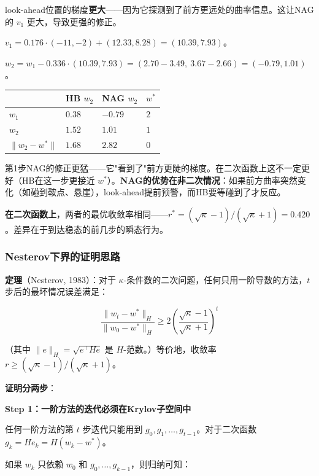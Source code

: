 \documentclass[12pt,a4paper]{article}
\begin{document}
look-ahead位置的梯度\textbf{更大}——因为它探测到了前方更远处的曲率信息。这让NAG的 $v_1$ 更大，导致更强的修正。

$v_1 = 0.176 \cdot (-11,-2) + (12.33, 8.28) = (10.39, 7.93)$。

$w_2 = w_1 - 0.336 \cdot (10.39, 7.93) = (2.70 - 3.49,\ 3.67 - 2.66) = (-0.79, 1.01)$。






\begin{center}\small
\begin{longtable}{|l|l|l|l|}
\hline
 & HB $w_2$ & NAG $w_2$ & $w^*$ \\
\hline
$w_1$ & $0.38$ & $-0.79$ & $2$ \\
$w_2$ & $1.52$ & $1.01$ & $1$ \\
$\|w_2 - w^*\|$ & $1.68$ & $2.82$ & $0$ \\
\hline
\end{longtable}
\end{center}


第1步NAG的修正更猛——它"看到了"前方更陡的梯度。在二次函数上这不一定更好（HB在这一步更接近 $w^*$）。\textbf{NAG的优势在非二次情况}：如果前方曲率突然变化（如碰到鞍点、悬崖），look-ahead提前预警，而HB要等碰到了才反应。

\textbf{在二次函数上}，两者的最优收敛率相同——$r^* = (\sqrt\kappa-1)/(\sqrt\kappa+1) = 0.420$。差异在于到达稳态的前几步的瞬态行为。


\subsubsection{Nesterov下界的证明思路}

\textbf{定理}（Nesterov, 1983）：对于 $\kappa$-条件数的二次问题，任何只用一阶导数的方法，$t$ 步后的最坏情况误差满足：


\[\frac{\|w_t - w^*\|_H}{\|w_0 - w^*\|_H} \ge 2\left(\frac{\sqrt\kappa - 1}{\sqrt\kappa + 1}\right)^t\]

（其中 $\|e\|_H = \sqrt{e^\top H e}$ 是 $H$-范数。）等价地，收敛率 $r \ge (\sqrt\kappa-1)/(\sqrt\kappa+1)$。

\textbf{证明分两步}：

\textbf{Step 1：一阶方法的迭代必须在Krylov子空间中}

任何一阶方法的第 $t$ 步迭代只能用到 $g_0, g_1, \ldots, g_{t-1}$。对于二次函数 $g_k = He_k = H(w_k - w^*)$。

如果 $w_k$ 只依赖 $w_0$ 和 $g_0, \ldots, g_{k-1}$，则归纳可知：
\end{document}
